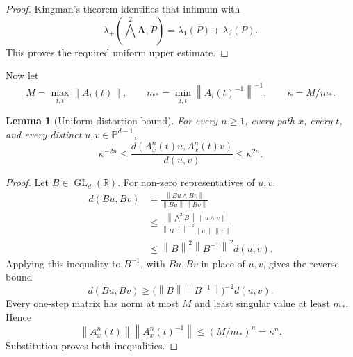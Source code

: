 \documentclass[11pt,a4paper]{amsart}
\newtheorem{lemma}[theorem]{Lemma}
\newtheorem{remark}[theorem]{Remark}
\newcommand{\T}{\mathbb T}
\newcommand{\R}{\mathbb R}
\newcommand{\PP}{\mathbb P}
\newcommand{\norm}[1]{\left\lVert #1\right\rVert}
\newcommand{\gap}{\Delta_{\mathrm{sp}}}
\begin{document}
\begin{proof}
Kingman's theorem identifies that infimum with
\[
 \lambda_+\!\left({\textstyle\bigwedge^2}\mathbf A,P\right)
 =\lambda_1(P)+\lambda_2(P).
\]
This proves the required uniform upper estimate.
\end{proof}


Now let
\[
 M=\max_{i,t}\norm{A_i(t)},\qquad
 m_*=\min_{i,t}\norm{A_i(t)^{-1}}^{-1},\qquad
 \kappa=M/m_*.
\]

\begin{lemma}[Uniform distortion bound]\label{lem:distortion}
For every \(n\ge1\), every path \(x\), every \(t\), and every
distinct \(u,v\in\PP^{d-1}\),
\[
 \kappa^{-2n}
 \le
 \frac{d(A_x^n(t)u,A_x^n(t)v)}{d(u,v)}
 \le
 \kappa^{2n}.
\]
\end{lemma}

\begin{proof}
Let \(B\in\operatorname{GL}_d(\R)\).  For non-zero representatives
of \(u,v\),
\[
\begin{aligned}
 d(Bu,Bv)
 &=\frac{\norm{Bu\wedge Bv}}{\norm{Bu}\norm{Bv}}\\
 &\le
 \frac{\norm{\bigwedge^2B}\,\norm{u\wedge v}}
      {\norm{B^{-1}}^{-2}\norm u\,\norm v}\\
 &\le \norm B^2\norm{B^{-1}}^2d(u,v).
\end{aligned}
\]
Applying this inequality to \(B^{-1}\), with \(Bu,Bv\) in place of
\(u,v\), gives the reverse bound
\[
 d(Bu,Bv)\ge
 \bigl(\norm B\norm{B^{-1}}\bigr)^{-2}d(u,v).
\]
Every one-step matrix has norm at most \(M\) and least singular value
at least \(m_*\).  Hence
\[
 \norm{A_x^n(t)}
 \norm{A_x^n(t)^{-1}}
 \le(M/m_*)^n=\kappa^n.
\]
Substitution proves both inequalities.
\end{proof}
\end{document}
